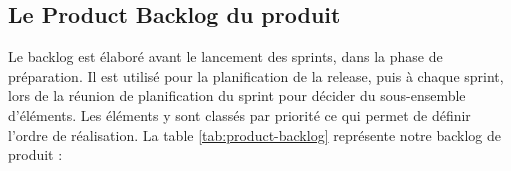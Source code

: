 \subsection[Le Product Backlog du produit]{Le Product Backlog du produit}
Le backlog est élaboré avant le lancement des sprints, dans la phase de préparation. Il est utilisé pour la planification de la release, puis à chaque sprint, lors de la réunion de planification du sprint pour décider du sous-ensemble d’éléments. Les éléments y sont classés par priorité ce qui permet de définir l’ordre de réalisation.
La table \ref{tab:product-backlog} représente notre backlog de produit :
\begin{table}[H]
	\centering
    \captionsetup{justification=centering}
	\caption{Backlog de produit}
	\label{tab:product-backlog}
\end{table}

